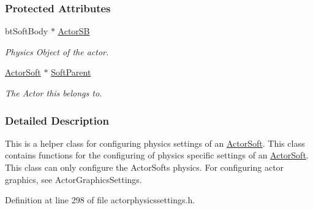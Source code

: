 \subsubsection*{Protected Attributes}
\begin{DoxyCompactItemize}
\item 
\hypertarget{classMezzanine_1_1ActorSoftPhysicsSettings_a44408487d6458ee64320be6d1283c1c0}{
btSoftBody $\ast$ \hyperlink{classMezzanine_1_1ActorSoftPhysicsSettings_a44408487d6458ee64320be6d1283c1c0}{ActorSB}}
\label{classMezzanine_1_1ActorSoftPhysicsSettings_a44408487d6458ee64320be6d1283c1c0}

\begin{DoxyCompactList}\small\item\em Physics Object of the actor. \item\end{DoxyCompactList}\item 
\hypertarget{classMezzanine_1_1ActorSoftPhysicsSettings_aa895658bc511f318b4a31234823d3e5c}{
\hyperlink{classMezzanine_1_1ActorSoft}{ActorSoft} $\ast$ \hyperlink{classMezzanine_1_1ActorSoftPhysicsSettings_aa895658bc511f318b4a31234823d3e5c}{SoftParent}}
\label{classMezzanine_1_1ActorSoftPhysicsSettings_aa895658bc511f318b4a31234823d3e5c}

\begin{DoxyCompactList}\small\item\em The Actor this belongs to. \item\end{DoxyCompactList}\end{DoxyCompactItemize}


\subsubsection{Detailed Description}
This is a helper class for configuring physics settings of an \hyperlink{classMezzanine_1_1ActorSoft}{ActorSoft}. This class contains functions for the configuring of physics specific settings of an \hyperlink{classMezzanine_1_1ActorSoft}{ActorSoft}. This class can only configure the ActorSofts physics. For configuring actor graphics, see ActorGraphicsSettings. 

Definition at line 298 of file actorphysicssettings.h.



